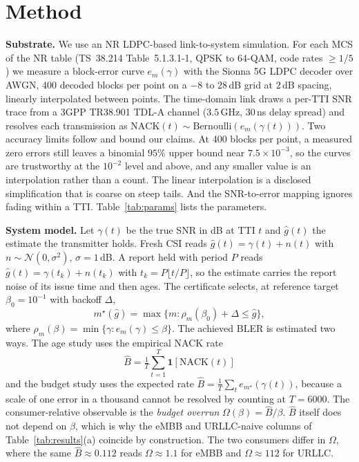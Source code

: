 \documentclass[conference]{IEEEtran}
\begin{document}
\section{Method}
\label{sec:method}
\textbf{Substrate.} We use an NR LDPC-based link-to-system simulation. For each
MCS of the NR table (TS~38.214 Table~5.1.3.1-1, QPSK to 64-QAM, code rates
$\ge 1/5$) we measure a block-error curve $e_m(\gamma)$ with the Sionna 5G LDPC
decoder \cite{sionna} over AWGN, 400 decoded blocks per point on a $-8$ to $28$\,dB grid at
$2$\,dB spacing, linearly interpolated between points. The time-domain link draws
a per-TTI SNR trace from a 3GPP TR38.901 TDL-A channel ($3.5$\,GHz, $30$\,ns
delay spread) and resolves each transmission as
$\mathrm{NACK}(t)\sim\mathrm{Bernoulli}(e_{m}(\gamma(t)))$. Two accuracy limits
follow and bound our claims. At 400 blocks per point, a measured zero errors
still leaves a binomial $95\%$ upper bound near $7.5\times10^{-3}$, so the
curves are trustworthy at the $10^{-2}$ level and above, and any smaller value
is an interpolation rather than a count. The linear interpolation is a disclosed
simplification that is coarse on steep tails. And the SNR-to-error mapping
ignores fading within a TTI. Table~\ref{tab:params} lists the parameters.

\textbf{System model.} Let $\gamma(t)$ be the true SNR in dB at TTI $t$ and
$\hat{g}(t)$ the estimate the transmitter holds. Fresh CSI reads
$\hat{g}(t)=\gamma(t)+n(t)$ with $n\sim\mathcal{N}(0,\sigma^2)$, $\sigma=1$\,dB.
A report held with period $P$ reads
$\hat{g}(t)=\gamma(t_k)+n(t_k)$ with $t_k=P\lfloor t/P\rfloor$, so the estimate
carries the report noise of its issue time and then ages. The certificate selects,
at reference target $\beta_0=10^{-1}$ with backoff $\Delta$,
\begin{equation}
m^\star(\hat{g})=\max\{m:\rho_m(\beta_0)+\Delta\le\hat{g}\},
\label{eq:cert}
\end{equation}
where $\rho_m(\beta)=\min\{\gamma:e_m(\gamma)\le\beta\}$. The achieved BLER is
estimated two ways. The age study uses the empirical NACK rate
\begin{equation}
\widehat{B}=\tfrac{1}{T}\textstyle\sum_{t=1}^{T}\mathbf{1}[\mathrm{NACK}(t)]
\label{eq:bler}
\end{equation}
and the budget study uses the expected rate
$\widehat{B}=\tfrac{1}{T}\sum_t e_{m^\star}(\gamma(t))$, because a scale of one
error in a thousand cannot be resolved by counting at $T{=}6000$. The
consumer-relative observable is the \emph{budget overrun}
$\Omega(\beta)=\widehat{B}/\beta$. $\widehat{B}$ itself does not depend on
$\beta$, which is why the eMBB and URLLC-naive columns of
Table~\ref{tab:results}(a) coincide by construction. The two consumers differ in
$\Omega$, where the same $\widehat{B}\approx 0.112$ reads $\Omega\approx 1.1$ for
eMBB and $\Omega\approx 112$ for URLLC.
\end{document}
